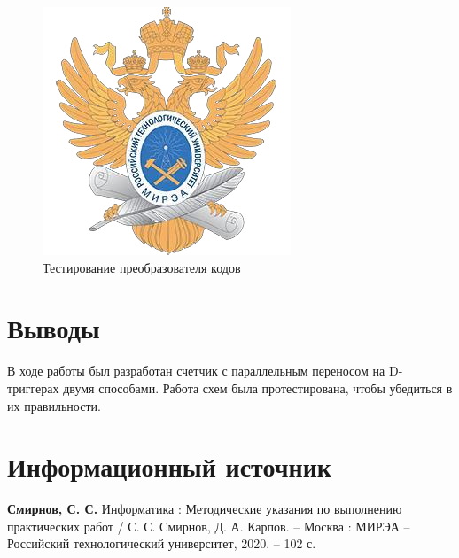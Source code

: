 \documentclass[14pt, a4paper]{extreport}
\begin{document}
\begin{figure}[H]
	\caption{Тестирование преобразователя кодов}
	\label{fig:code}
	\includegraphics[width=\textwidth]{logo}
\end{figure}

\chapter{Выводы}
В ходе работы был разработан счетчик с параллельным переносом на D-триггерах двумя способами. Работа схем была протестирована, чтобы убедиться в их правильности.

\chapter{Информационный источник}
\textbf{Смирнов, С. С.} Информатика : Методические указания по выполнению практических работ / С. С. Смирнов, Д. А. Карпов. -- Москва : МИРЭА -- Российский технологический университет, 2020. -- 102 с.
\end{document}
